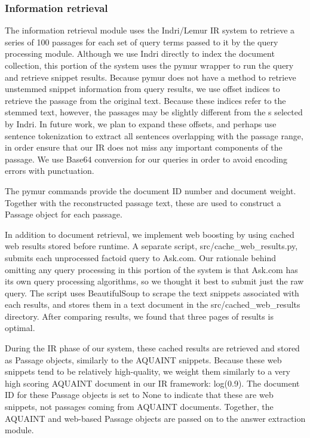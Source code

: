 \documentclass[11pt]{article}
\begin{document}
\subsubsection{Information retrieval}

The information retrieval module uses the Indri/Lemur IR system to retrieve a series of 100 passages for each set of query terms passed to it by the query processing module. Although we use Indri directly to index the document collection, this portion of the system uses the pymur wrapper to run the query and retrieve snippet results. Because pymur does not have a method to retrieve unstemmed snippet information from query results, we use offset indices to retrieve the passage from the original text. Because these indices refer to the stemmed text, however, the passages may be slightly different from the s selected by Indri. In future work, we plan to expand these offsets, and perhaps use sentence tokenization to extract all sentences overlapping with the passage range, in order ensure that our IR does not miss any important components of the passage. We use Base64 conversion for our queries in order to avoid encoding errors with punctuation.

The pymur commands provide the document ID number and document weight. Together with the reconstructed passage text, these are used to construct a Passage object for each passage. 

In addition to document retrieval, we implement web boosting by using cached web results stored before runtime. A separate script, src/cache\_web\_results.py, submits each unprocessed factoid query to Ask.com. Our rationale behind omitting any query processing in this portion of the system is that Ask.com has its own query processing algorithms, so we thought it best to submit just the raw query. The script uses BeautifulSoup to scrape the text snippets associated with each results, and stores them in a text document in the src/cached\_web\_results directory. After comparing results, we found that three pages of results is optimal. 

During the IR phase of our system, these cached results are retrieved and stored as Passage objects, similarly to the AQUAINT snippets. Because these web snippets tend to be relatively high-quality, we weight them similarly to a very high scoring AQUAINT document in our IR framework: log(0.9).  The document ID for these Passage objects is set to None to indicate that these are web snippets, not passages coming from AQUAINT documents.  Together, the AQUAINT and web-based Passage objects are passed on to the answer extraction module. 
\end{document}
